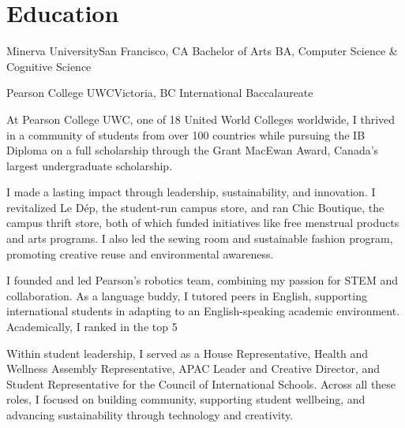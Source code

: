\section{Education}
    \resumeSubHeadingListStart

\resumeSubheading
    {Minerva University}{San Francisco, CA}
    {Bachelor of Arts BA, Computer Science \& Cognitive Science} 
    {}
    \resumeItemListStart
     
    \resumeItemListEnd
      \resumeSubheading
    {Pearson College UWC}{Victoria, BC}
    {International Baccalaureate}  
{At Pearson College UWC, one of 18 United World Colleges worldwide, I thrived in a community of students from over 100 countries while pursuing the IB Diploma on a full scholarship through the Grant MacEwan Award, Canada’s largest undergraduate scholarship.

I made a lasting impact through leadership, sustainability, and innovation. I revitalized Le Dép, the student-run campus store, and ran Chic Boutique, the campus thrift store, both of which funded initiatives like free menstrual products and arts programs. I also led the sewing room and sustainable fashion program, promoting creative reuse and environmental awareness.

I founded and led Pearson’s robotics team, combining my passion for STEM and collaboration. As a language buddy, I tutored peers in English, supporting international students in adapting to an English-speaking academic environment. Academically, I ranked in the top 5%

Within student leadership, I served as a House Representative, Health and Wellness Assembly Representative, APAC Leader and Creative Director, and Student Representative for the Council of International Schools. Across all these roles, I focused on building community, supporting student wellbeing, and advancing sustainability through technology and creativity.}
    \resumeSubHeadingListEnd
